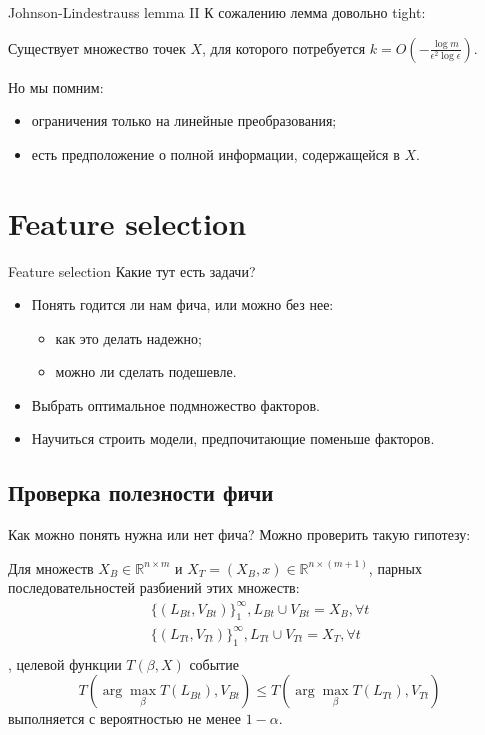 \documentclass[14pt, fleqn, xcolor={dvipsnames, table}]{beamer}
\begin{document}
\begin{frame}{Johnson-Lindestrauss lemma II}
К сожалению лемма довольно tight:
\begin{theorem}{}
Существует множество точек $X$, для которого потребуется $k = O(-\frac{\log m}{\epsilon^2 \log \epsilon})$.
\end{theorem}
Но мы помним:
\begin{itemize}
  \item ограничения только на линейные преобразования;
  \item есть предположение о полной информации, содержащейся в $X$.
\end{itemize}
\end{frame}

\section{Feature selection}
\begin{frame}{Feature selection}
Какие тут есть задачи?
\begin{itemize}
  \item Понять годится ли нам фича, или можно без нее:
  \begin{itemize}
    \item как это делать надежно;
    \item можно ли сделать подешевле.
  \end{itemize}
  \item Выбрать оптимальное подмножество факторов.
  \item Научиться строить модели, предпочитающие поменьше факторов.
\end{itemize}
\end{frame}

\subsection{Проверка полезности фичи}
\begin{frame}{Как можно понять нужна или нет фича?}
Можно проверить такую гипотезу:
\begin{theorem}{}{} \small Для множеств $X_B \in \mathbb{R}^{n\times m}$ и $X_T = (X_B, x) \in \mathbb{R}^{n\times (m+1)}$, парных последовательностей разбиений этих множеств:
$$\begin{array}{l}
\{(L_{Bt}, V_{Bt})\}_1^{\infty}, L_{Bt} \cup V_{Bt} = X_B, \forall t\\
\{(L_{Tt}, V_{Tt})\}_1^{\infty}, L_{Tt} \cup V_{Tt} = X_T, \forall t\\
\end{array}$$
, целевой функции $T(\beta, X)$ событие
$$
T(\arg \max_{\beta} T(L_{Bt}), V_{Bt}) \le T(\arg \max_{\beta} T(L_{Tt}), V_{Tt})
$$
выполняется с вероятностью не менее $1 - \alpha$.
\end{theorem}
\end{frame}
\end{document}
